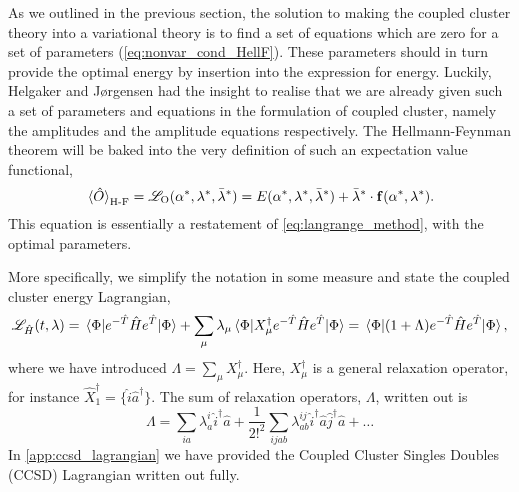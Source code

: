 As we outlined in the previous section, the solution to making the coupled cluster 
theory into a variational theory is to find a set of equations which are zero for a set
of parameters (\autoref{eq:nonvar_cond_HellF}). These parameters should in turn provide the optimal energy by insertion 
into the expression for energy. Luckily, Helgaker and 
Jørgensen \cite{helgaker1988analytical,helgaker1989configuration} had the insight to 
realise that we are already given such a set of parameters and equations in the 
formulation of coupled cluster, namely the amplitudes and the amplitude equations
respectively. The Hellmann-Feynman theorem will be baked into the very definition 
of such an expectation value functional,
\begin{equation}
    \ev*{\hat{O}}_{\text{H-F}} 
        = \mathscr{L}_{\text{O}}(\alpha^*, \vb{\lambda}^*, \bar{\vb{\lambda}}^*)
        = E(\alpha^*, \vb{\lambda}^*, \bar{\vb{\lambda}}^*)
        + \bar{\vb{\lambda}}^* \cdot \vb{f}(\alpha^*, \vb{\lambda}^*).
\end{equation}
This equation is essentially a restatement of \autoref{eq:langrange_method}, with  
the optimal parameters.

More specifically, we simplify the notation in some measure and state the coupled
cluster energy Lagrangian,
\begin{equation}
    \label{eq:cc_energy_lagrangian}
    \mathscr{L}_{\hat{H}}(t, \lambda) 
        = \mel{\Phi}{e^{-\hat{T}}\hat{H}e^{\hat{T}}}{\Phi}
        + \sum_\mu \lambda_\mu \mel{\Phi}{X_\mu^\dagger e^{-\hat{T}} \hat{H} e^{\hat{T}}}{\Phi}
        = \mel{\Phi}{(1 + \Lambda)e^{-\hat{T}}\hat{H}e^{\hat{T}} }{\Phi},
\end{equation}
where we have introduced $\Lambda = \sum_\mu X^\dagger_\mu$. Here, $X^\dagger_\mu$ is a
general relaxation operator, for instance $\hat{X}_1^\dagger = \{\hat{i}\hat{a}^\dagger\}$.
The sum of relaxation operators, $\Lambda$, written out is 
\begin{equation}
    \label{eq:capital_lambda}
    \Lambda = \sum_{ia}\lambda^i_a \hat{i}^\dagger \hat{a}
    + \frac{1}{2!^2}\sum_{ijab} 
        \lambda^{ij}_{ab} \hat{i}^\dagger \hat{a} \hat{j}^\dagger \hat{a}
    + \dots
\end{equation}
In \autoref{app:ccsd_lagrangian} we have provided the Coupled Cluster 
Singles Doubles (CCSD) Lagrangian written out fully.

